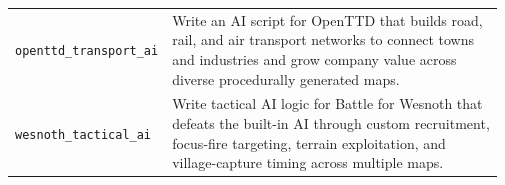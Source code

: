 \begin{longtable}{@{}>{\raggedright\arraybackslash}p{0.20\linewidth}>{\raggedright\arraybackslash}p{0.77\linewidth}@{}}
\tasknoterule
\texttt{openttd\_\allowbreak{}transport\_\allowbreak{}ai} & Write an AI script for OpenTTD that builds road, rail, and air transport networks to connect towns and industries and grow company value across diverse procedurally generated maps. \\
\tasknoterule
\texttt{wesnoth\_\allowbreak{}tactical\_\allowbreak{}ai} & Write tactical AI logic for Battle for Wesnoth that defeats the built-in AI through custom recruitment, focus-fire targeting, terrain exploitation, and village-capture timing across multiple maps. \\
\end{longtable}
\endgroup
